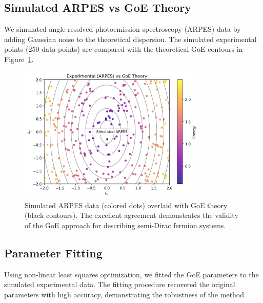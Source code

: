 \documentclass[12pt]{article}
\begin{document}
\subsection{Simulated ARPES vs GoE Theory}

We simulated angle-resolved photoemission spectroscopy (ARPES) data by adding Gaussian noise to the theoretical dispersion. The simulated experimental points (250 data points) are compared with the theoretical GoE contours in Figure~\ref{fig:arpes}.

\begin{figure}[H]
    \centering
    \includegraphics[width=0.8\textwidth]{goe_arpes_compare.png}
    \caption{Simulated ARPES data (colored dots) overlaid with GoE theory (black contours). The excellent agreement demonstrates the validity of the GoE approach for describing semi-Dirac fermion systems.}
    \label{fig:arpes}
\end{figure}

\subsection{Parameter Fitting}

Using non-linear least squares optimization, we fitted the GoE parameters to the simulated experimental data. The fitting procedure recovered the original parameters with high accuracy, demonstrating the robustness of the method.
\end{document}

